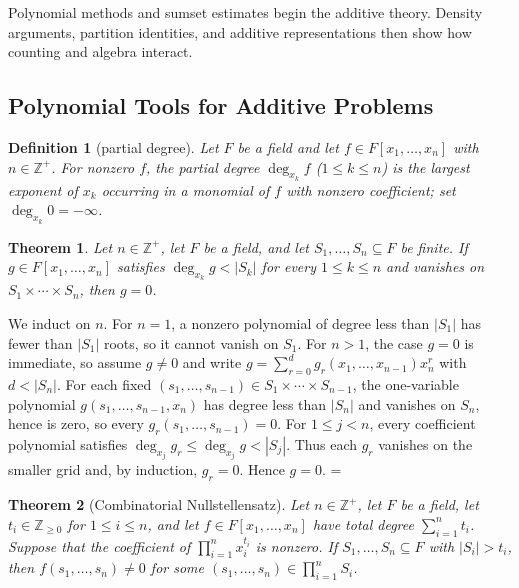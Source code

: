 \documentclass[11pt]{article}
\makeatletter
\theoremstyle{ntstyle}
\newtheorem{theorem}{Theorem}[subsection]
\newtheorem{definition}{Definition}[subsection]
\let\nt@closedisplay\]
\def\nt@guardedclose{\@ifnextchar\par{\nt@closeafterpar}{\@ifnextchar\end{\postdisplaypenalty\@M\nt@closedisplay}{\nt@closedisplay}}}
\def\nt@closeafterpar\par{\@ifnextchar\par{\nt@closeafterpar}{\@ifnextchar\end{\postdisplaypenalty\@M\nt@closedisplay\par}{\nt@closedisplay\par}}}
\renewenvironment{proof}[1][\proofname]{\par
  \pushQED{\qed}\normalfont\topsep\medskipamount\edef\nt@afterproof{\@endparpenalty=\the\@endparpenalty\relax}\@beginparpenalty\@M\@endparpenalty\@M\let\]\nt@guardedclose\trivlist\item[]\textit{#1\@addpunct{.}} \ignorespaces}{\ifvmode\addpenalty\@M\fi\popQED\nt@afterproof\endtrivlist\@endpefalse}
\makeatother
\begin{document}
Polynomial methods and sumset estimates begin the additive theory. Density arguments, partition identities, and
additive representations then show how counting and algebra interact.

\subsection{Polynomial Tools for Additive Problems}

\begin{definition}[partial degree]\label{def:12.1.1} Let $F$ be a field and let
	$f\in F[x_1,\ldots,x_n]$ with $n\in\mathbb{Z}^+$. For nonzero $f$, the
	partial degree $\deg_{x_k}f$ ($1\le k\le n$) is the largest exponent of
	$x_k$ occurring in a monomial of $f$ with nonzero coefficient; set
	$\deg_{x_k}0=-\infty$.
\end{definition}
\begin{theorem}\label{thm:12.1.1} Let $n\in\mathbb{Z}^+$, let $F$ be a
	field, and let $S_1,\ldots,S_n\subseteq F$ be finite. If
	$g\in F[x_1,\ldots,x_n]$ satisfies $\deg_{x_k}g<|S_k|$ for every
	$1\le k\le n$ and vanishes on $S_1\times\cdots\times S_n$, then $g=0$.
\end{theorem}

\begin{proof} We induct on $n$. For $n=1$, a nonzero
	polynomial of degree less than $|S_1|$ has fewer than $|S_1|$ roots, so it cannot
	vanish on $S_1$. For $n>1$, the case $g=0$ is immediate, so assume
	$g\neq0$ and write
	$g=\sum_{r=0}^{d}g_r(x_1,\ldots,x_{n-1})x_n^{r}$ with $d<|S_n|$. For
	each fixed $(s_1,\ldots,s_{n-1})\in S_1\times\cdots\times S_{n-1}$,
	the one-variable polynomial $g(s_1,\ldots,s_{n-1},x_n)$ has degree less than $|S_n|$ and
	vanishes on $S_n$, hence is zero, so every
	$g_r(s_1,\ldots,s_{n-1})=0$. For $1\le j<n$, every coefficient
	polynomial satisfies $\deg_{x_j}g_r\le\deg_{x_j}g<|S_j|$. Thus each
	$g_r$ vanishes on the smaller grid and, by induction, $g_r=0$. Hence
	$g=0$.
\end{proof}
\begin{theorem}[Combinatorial Nullstellensatz]\label{thm:12.1.2} Let
	$n\in\mathbb{Z}^+$, let $F$ be a field, let
	$t_i\in\mathbb{Z}_{\ge0}$ for $1\le i\le n$, and let
	$f\in F[x_1,\ldots,x_n]$ have total degree
	$\sum_{i=1}^n t_i$. Suppose that the coefficient of $\prod_{i=1}^{n}x_i^{t_i}$
	is nonzero. If $S_1,\ldots,S_n\subseteq F$ with $|S_i| > t_i$, then
	$f(s_1,\ldots,s_n)\neq0$ for some
	$(s_1,\ldots,s_n)\in\prod_{i=1}^{n}S_i$.
\end{theorem}
\end{document}
